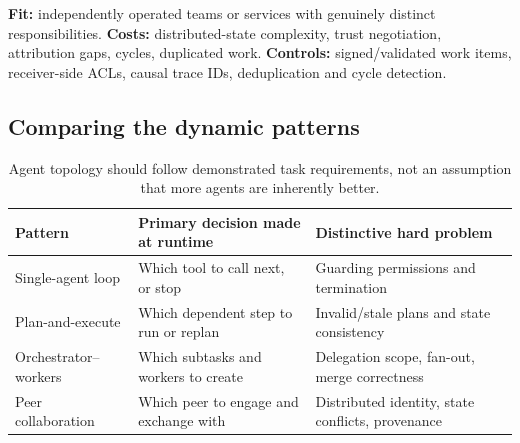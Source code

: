 \textbf{Fit:} independently operated teams or services with genuinely distinct responsibilities. \textbf{Costs:} distributed-state complexity, trust negotiation, attribution gaps, cycles, duplicated work. \textbf{Controls:} signed/validated work items, receiver-side ACLs, causal trace IDs, deduplication and cycle detection.

\subsection{Comparing the dynamic patterns}
\begin{table}[htbp]\small\centering
\begin{tabularx}{\linewidth}{@{}p{28mm}Y Y@{}}\toprule
\textbf{Pattern} & \textbf{Primary decision made at runtime} & \textbf{Distinctive hard problem}\\\midrule
Single-agent loop & Which tool to call next, or stop & Guarding permissions and termination\\
Plan-and-execute & Which dependent step to run or replan & Invalid/stale plans and state consistency\\
Orchestrator--workers & Which subtasks and workers to create & Delegation scope, fan-out, merge correctness\\
Peer collaboration & Which peer to engage and exchange with & Distributed identity, state conflicts, provenance\\\bottomrule
\end{tabularx}
\caption{Agent topology should follow demonstrated task requirements, not an assumption that more agents are inherently better.}
\end{table}
